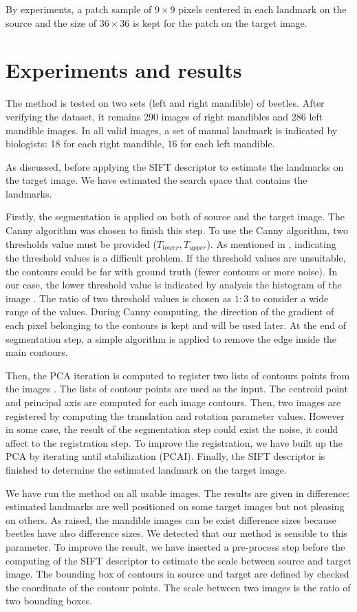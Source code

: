 \documentclass{gretsi}
\begin{document}
By experiments, a patch sample of $9 \times 9$ pixels centered in each landmark on the source and the size of $36 \times 36$ is kept for the patch on the target image.
\section{Experiments and results}
The method is tested on two sets (left and right mandible) of beetles. After verifying the dataset, it remains 290 images of right mandibles and 286 left mandible images. In all valid images, a set of manual landmark is indicated by biologists: 18 for each right mandible, 16 for each left mandible.

As discussed, before applying the SIFT descriptor to estimate the landmarks on the target image. We have estimated the search space that contains the landmarks.

Firstly, the segmentation is applied on both of source and the target image. The Canny algorithm \cite{canny1986computational} was chosen to finish this step. To use the Canny algorithm, two thresholds value must be provided ($T_{lower}, T_{upper}$). As mentioned in \cite{adaptiveCanny}, indicating the threshold values is a difficult problem. If the threshold values are unsuitable, the contours could be far with ground truth (fewer contours or more noise). In our case, the lower threshold value is indicated by analysis the histogram of the image \cite{leestimating}. The ratio of two threshold values is chosen as $1 : 3$ to consider a wide range of the values. During Canny computing, the direction of the gradient of each pixel belonging to the contours is kept and will be used later. At the end of segmentation step, a simple algorithm is applied to remove the edge inside the main contours.

Then, the PCA iteration is computed to register two lists of contours points from the images \cite{shlens2014tutorial, jolliffe2002principal}. The lists of contour points are used  as the input. The centroid point and principal axis are computed for each image contours. Then, two images are registered by computing the translation and rotation parameter values. However in some case, the result of the segmentation step could exist the noise, it could affect to the registration step. To improve the registration, we have built up the PCA by iterating until stabilization (PCAI). Finally, the SIFT descriptor is finished to determine the estimated landmark on the target image.

We have run the method on all usable images. The results are given in difference: estimated landmarks are well positioned on some target images but not pleasing on others. As raised, the mandible images can be exist difference sizes because beetles have also difference sizes. We detected that our method is sensible to this parameter. To improve the result, we have inserted a pre-process step before the computing of the SIFT descriptor to estimate the scale between source and target image. The bounding box of contours in source and target are defined by checked the coordinate of the contour points. The scale between two images is the ratio of two bounding boxes.
\end{document}

